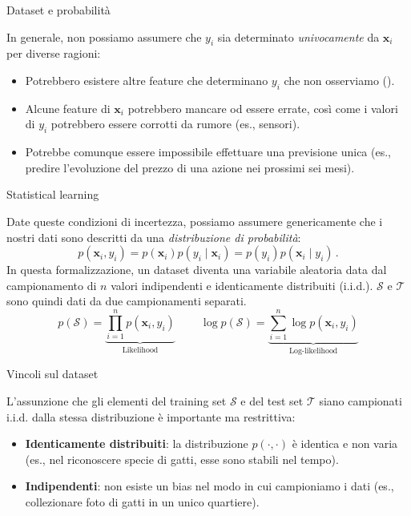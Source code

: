 \documentclass[12pt,aspectratio=169]{beamer}
\begin{document}
\begin{frame}{Dataset e probabilità}
	
	In generale, non possiamo assumere che $y_i$ sia determinato \textit{univocamente} da $\mathbf{x}_i$ per diverse ragioni:
	\begin{itemize}
		\item Potrebbero esistere altre feature che determinano $y_i$ che non osserviamo ().
		\item Alcune feature di $\boldsymbol{x}_i$ potrebbero mancare od essere errate, così come i valori di $y_i$ potrebbero essere corrotti da rumore (es., sensori).
		\item Potrebbe comunque essere impossibile effettuare una previsione unica (es., predire l'evoluzione del prezzo di una azione nei prossimi sei mesi).
	\end{itemize}
	
\end{frame}

\begin{frame}{Statistical learning}
	
	Date queste condizioni di incertezza, possiamo assumere genericamente che i nostri dati sono descritti da una \textit{distribuzione di probabilità}:
	$$p(\boldsymbol{x}_i, y_i) = p(\boldsymbol{x}_i)p(y_i \mid \boldsymbol{x}_i) = p(y_i)p(\mathbf{x}_i \mid y_i) \,.$$
	In questa formalizzazione, un dataset diventa una variabile aleatoria data dal campionamento di $n$ valori indipendenti e identicamente distribuiti (i.i.d.). $\mathcal{S}$ e $\mathcal{T}$ sono quindi dati da due campionamenti separati.
	\begin{equation*}
		p(\mathcal{S}) = \underbrace{\prod_{i=1}^n p(\mathbf{x}_i, y_i)}_{\text{Likelihood}} \;\;\;\;\;\;\;\; \log p(\mathcal{S}) = \underbrace{\sum_{i=1}^n \log p(\mathbf{x}_i, y_i)}_{\text{Log-likelihood}}
	\end{equation*}	

\end{frame}

\begin{frame}{Vincoli sul dataset}
	
	L'assunzione che gli elementi del training set $\mathcal{S}$ e del test set $\mathcal{T}$ siano campionati i.i.d. dalla stessa distribuzione è importante ma restrittiva:
	
	\begin{itemize}
		\item \textbf{Identicamente distribuiti}: la distribuzione $p(\cdot, \cdot)$ è identica e non varia (es., nel riconoscere specie di gatti, esse sono stabili nel tempo).
		\item \textbf{Indipendenti}: non esiste un bias nel modo in cui campioniamo i dati (es., collezionare foto di gatti in un unico quartiere).
	\end{itemize}
	
\end{frame}
\end{document}
